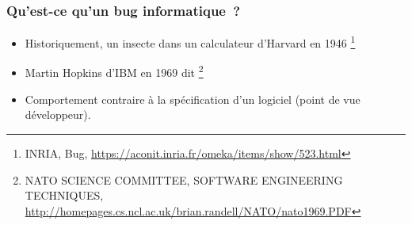\documentclass{beamer}
\begin{document}
    \begin{frame}
        \transdissolve
        \frametitle{Qu'est-ce qu'un bug informatique~?}
        \begin{itemize}

            \item Historiquement, un insecte dans un calculateur d'Harvard en 1946 \footnote{INRIA, Bug, \url{https://aconit.inria.fr/omeka/items/show/523.html}}
            \item Martin Hopkins d'IBM en 1969 dit \footnote{NATO SCIENCE COMMITTEE, SOFTWARE ENGINEERING TECHNIQUES, \url{http://homepages.cs.ncl.ac.uk/brian.randell/NATO/nato1969.PDF}}
            \item Comportement contraire à la spécification d'un logiciel (point de vue développeur).
        \end{itemize}
    \end{frame}
\end{document}
